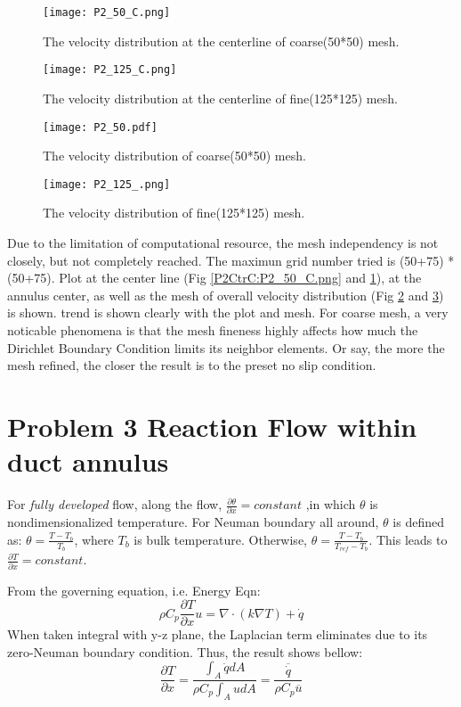 \documentclass[a4paper,10pt]{report}
\begin{document}
\begin{figure}[ht]
\centering
\texttt{[image: P2\_50\_C.png]}
\caption{The velocity distribution at the centerline of coarse(50*50) mesh.}
\label{P2CtrC:P2_50_C.png}
\texttt{[image: P2\_125\_C.png]}
\caption{The velocity distribution at the centerline of fine(125*125) mesh.}
\label{P2CtrF:P2_125_C.png}
\end{figure}

\begin{figure}[ht]
\centering
\texttt{[image: P2\_50.pdf]}
\caption{The velocity distribution of coarse(50*50) mesh.}
\label{P2meshC:P2_50.pdf}
\end{figure}
\begin{figure}[ht]
\centering
\texttt{[image: P2\_125\_.png]}
\caption{The velocity distribution of fine(125*125) mesh.}
\label{P2meshF:P2_125_.png}
\end{figure}


Due to the limitation of computational resource, the mesh independency is not closely, but not completely reached. 
The maximun grid number tried is (50+75) * (50+75). Plot at the center line (Fig \ref{P2CtrC:P2_50_C.png} and 
\ref{P2CtrF:P2_125_C.png}), at the annulus center, as well as the mesh of overall velocity distribution (Fig 
\ref{P2meshC:P2_50.pdf} and \ref{P2meshF:P2_125_.png}) is shown. trend is shown clearly with the plot and mesh. 
For coarse mesh, a very noticable phenomena is that the mesh fineness highly affects how much the Dirichlet Boundary 
Condition limits its neighbor elements. Or say, the more the mesh refined, the closer the result is to the preset 
no slip condition.


\section{Problem 3 Reaction Flow within duct annulus}


For \emph{fully developed} flow, along the flow, $ \frac{\partial \theta}{\partial x} = constant $ ,in which $ \theta $ 
is nondimensionalized temperature. For Neuman boundary all around, $ \theta $ is defined as: $ \theta = \frac{T - T_b}{T_b}$, 
where $T_b$ is bulk temperature. Otherwise, $ \theta = \frac{T - T_b}{T_{ref} - T_b} $. This leads to $ \frac{\partial T}{\partial x} = constant $. 


From the governing equation, i.e. Energy Eqn:
\begin{equation}
 \rho C_p \frac{\partial T}{\partial x} u = \nabla \cdot ( k \nabla T ) + \dot q
\end{equation}
When taken integral with y-z plane, the Laplacian term eliminates due to its zero-Neuman boundary condition. Thus, the result 
shows bellow:
\begin{equation}
 \frac{\partial T}{\partial x} = \frac{\int_A \dot q dA}{\rho C_p \int_A u dA} = \frac{\overline{\dot q}}{\rho C_p \overline{u}}
\end{equation}
\end{document}
